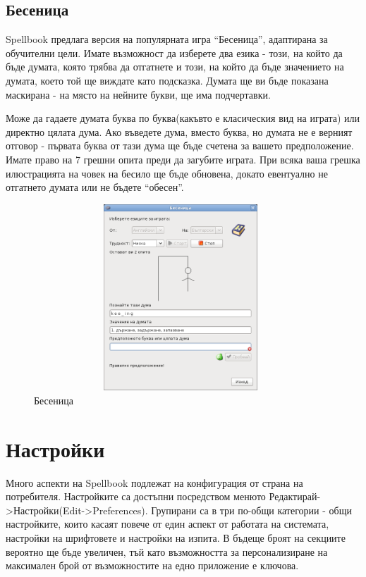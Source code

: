 \subsection{Бесеница}
Spellbook предлага версия на популярната игра "`Бесеница"', адаптирана
за обучителни цели. Имате възможност да изберете два езика -
този, на който да бъде думата, която трябва да отгатнете и този, на
който да бъде значението на думата, което той ще виждате като
подсказка. Думата ще ви бъде показана маскирана - на място на нейните
букви, ще има подчертавки.

Може да гадаете думата буква по буква(какъвто е класическия вид на
играта) или директно цялата дума. Ако въведете дума, вместо буква, но
думата не е верният отговор - първата буква от тази дума ще бъде
счетена за вашето предположение. Имате право на 7 грешни опита преди
да загубите играта. При всяка ваша грешка илюстрацията на човек на
бесило ще бъде обновена, докато евентуално не отгатнето думата или не
бъдете "`обесен"'.

\begin{figure}[htbp]
  \caption{Бесеница}
  \centering
  \includegraphics[width=110mm, height=70mm]{images/hangman.png}
\end{figure}

\section{Настройки}
Много аспекти на Spellbook подлежат на конфигурация от страна на
потребителя. Настройките са достъпни посредством менюто
Редактирай->Настройки(Edit->Preferences). Групирани са в три по-общи
категории - общи настройките, които касаят повече от един аспект от
работата на системата, настройки на шрифтовете и настройки на
изпита. В бъдеще броят на секциите вероятно ще бъде увеличен, тъй като
възможността за персонализиране на максимален брой от възможностите на
едно приложение е ключова.
